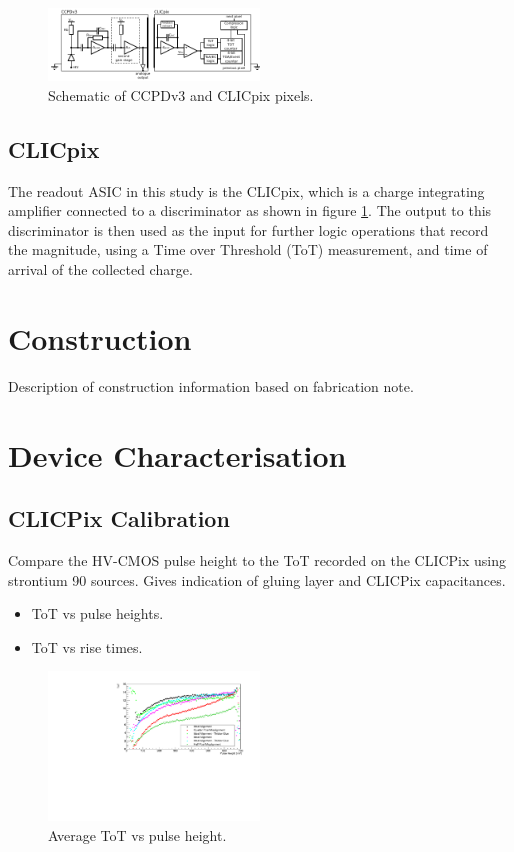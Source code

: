 \begin{figure}
\centering
\includegraphics[width=0.5\textwidth]{CLICdpVertex/Plots/schematic.pdf}
\caption[Schematic of CCPDv3 and CLICpix pixels.]{Schematic of CCPDv3 and CLICpix pixels.}
\label{fig:ccpdandclicpix}
\end{figure}

\subsection{CLICpix}

The readout ASIC in this study is the CLICpix, which is a charge integrating amplifier connected to a discriminator as shown in figure \ref{fig:ccpdandclicpix}.  The output to this discriminator is then used as the input for further logic operations that record the magnitude, using a Time over Threshold (ToT) measurement, and time of arrival of the collected charge.

\section{Construction}
Description of construction information based on fabrication note.

\section{Device Characterisation}

\subsection{CLICPix Calibration}
Compare the HV-CMOS pulse height to the ToT recorded on the CLICPix using strontium 90 sources.  Gives indication of gluing layer and CLICPix capacitances.  

\begin{itemize}
\item ToT vs pulse heights.  
\item ToT vs rise times.  
\end{itemize}

\begin{figure}
\centering
\includegraphics[width=0.5\textwidth]{CLICdpVertex/Plots/TargetToT_vs_PulseHeight.pdf}
\caption[Average ToT vs pulse height.]{Average ToT vs pulse height.}
\label{fig:avgtotvspulseheight}
\end{figure}

